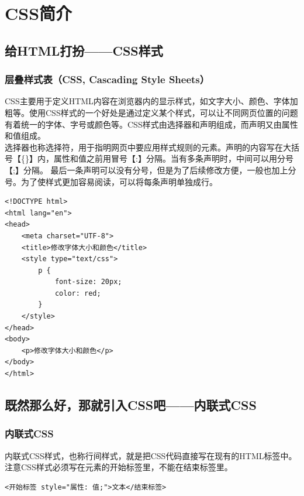 \chapter{CSS简介}

\section{给HTML打扮——CSS样式}

\subsection{层叠样式表（CSS, Cascading Style Sheets）}

CSS主要用于定义HTML内容在浏览器内的显示样式，如文字大小、颜色、字体加粗等。使用CSS样式的一个好处是通过定义某个样式，可以让不同网页位置的问题有着统一的字体、字号或颜色等。CSS样式由选择器和声明组成，而声明又由属性和值组成。 \\

选择器也称选择符，用于指明网页中要应用样式规则的元素。声明的内容写在大括号【\{\}】内，属性和值之前用冒号【:】分隔。当有多条声明时，中间可以用分号【;】分隔。 最后一条声明可以没有分号，但是为了后续修改方便，一般也加上分号。为了使样式更加容易阅读，可以将每条声明单独成行。

\begin{lstlisting}[style=htmlcssjs, title=修改字体大小和颜色]
<!DOCTYPE html>
<html lang="en">
<head>
    <meta charset="UTF-8">
    <title>修改字体大小和颜色</title>
    <style type="text/css">
        p {
            font-size: 20px;
            color: red;
        }
    </style>
</head>
<body>
    <p>修改字体大小和颜色</p>
</body>
</html>
\end{lstlisting}

\newpage

\section{既然那么好，那就引入CSS吧——内联式CSS}

\subsection{内联式CSS}

内联式CSS样式，也称行间样式，就是把CSS代码直接写在现有的HTML标签中。注意CSS样式必须写在元素的开始标签里，不能在结束标签里。 \\

\begin{lstlisting}[style=htmlcssjs]
<开始标签 style="属性: 值;">文本</结束标签>
\end{lstlisting}

